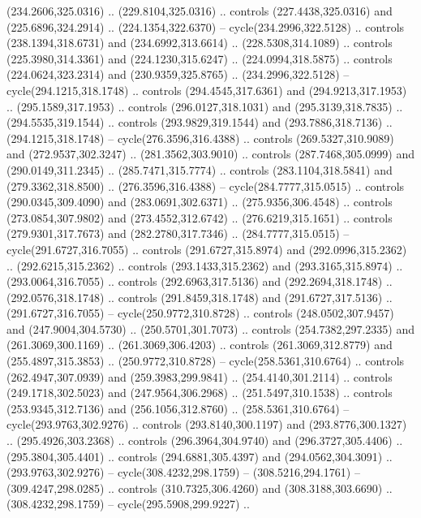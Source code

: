 \begin{scope}[cm={{1.25,0.0,0.0,-1.25,(0.0,743.43331)}}]
    (234.2606,325.0316) .. (229.8104,325.0316) .. controls (227.4438,325.0316) and
    (225.6896,324.2914) .. (224.1354,322.6370) -- cycle(234.2996,322.5128) ..
    controls (238.1394,318.6731) and (234.6992,313.6614) .. (228.5308,314.1089) ..
    controls (225.3980,314.3361) and (224.1230,315.6247) .. (224.0994,318.5875) ..
    controls (224.0624,323.2314) and (230.9359,325.8765) .. (234.2996,322.5128) --
    cycle(294.1215,318.1748) .. controls (294.4545,317.6361) and
    (294.9213,317.1953) .. (295.1589,317.1953) .. controls (296.0127,318.1031) and
    (295.3139,318.7835) .. (294.5535,319.1544) .. controls (293.9829,319.1544) and
    (293.7886,318.7136) .. (294.1215,318.1748) -- cycle(276.3596,316.4388) ..
    controls (269.5327,310.9089) and (272.9537,302.3247) .. (281.3562,303.9010) ..
    controls (287.7468,305.0999) and (290.0149,311.2345) .. (285.7471,315.7774) ..
    controls (283.1104,318.5841) and (279.3362,318.8500) .. (276.3596,316.4388) --
    cycle(284.7777,315.0515) .. controls (290.0345,309.4090) and
    (283.0691,302.6371) .. (275.9356,306.4548) .. controls (273.0854,307.9802) and
    (273.4552,312.6742) .. (276.6219,315.1651) .. controls (279.9301,317.7673) and
    (282.2780,317.7346) .. (284.7777,315.0515) -- cycle(291.6727,316.7055) ..
    controls (291.6727,315.8974) and (292.0996,315.2362) .. (292.6215,315.2362) ..
    controls (293.1433,315.2362) and (293.3165,315.8974) .. (293.0064,316.7055) ..
    controls (292.6963,317.5136) and (292.2694,318.1748) .. (292.0576,318.1748) ..
    controls (291.8459,318.1748) and (291.6727,317.5136) .. (291.6727,316.7055) --
    cycle(250.9772,310.8728) .. controls (248.0502,307.9457) and
    (247.9004,304.5730) .. (250.5701,301.7073) .. controls (254.7382,297.2335) and
    (261.3069,300.1169) .. (261.3069,306.4203) .. controls (261.3069,312.8779) and
    (255.4897,315.3853) .. (250.9772,310.8728) -- cycle(258.5361,310.6764) ..
    controls (262.4947,307.0939) and (259.3983,299.9841) .. (254.4140,301.2114) ..
    controls (249.1718,302.5023) and (247.9564,306.2968) .. (251.5497,310.1538) ..
    controls (253.9345,312.7136) and (256.1056,312.8760) .. (258.5361,310.6764) --
    cycle(293.9763,302.9276) .. controls (293.8140,300.1197) and
    (293.8776,300.1327) .. (295.4926,303.2368) .. controls (296.3964,304.9740) and
    (296.3727,305.4406) .. (295.3804,305.4401) .. controls (294.6881,305.4397) and
    (294.0562,304.3091) .. (293.9763,302.9276) -- cycle(308.4232,298.1759) --
    (308.5216,294.1761) -- (309.4247,298.0285) .. controls (310.7325,306.4260) and
    (308.3188,303.6690) .. (308.4232,298.1759) -- cycle(295.5908,299.9227) ..

\end{scope}
